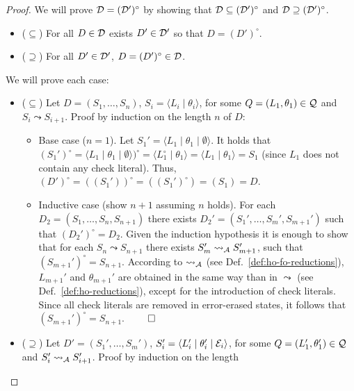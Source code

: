 \documentclass{llncs}
\newcommand{\A}
  {\ensuremath{{\cal A}}}
\newcommand{\gd}[0]{\mid}
\newcommand{\state}[2]
  {\ensuremath{\langle #1 \gd{} #2 \rangle}}
\newcommand{\exstate}[3]
  {\ensuremath{\langle #1 \gd{} #2 \gd{} #3 \rangle}}
\newcommand{\ADeps}{\ensuremath{{\cal E}}}
\newcommand{\reduction}[2]
  {\ensuremath{#1 \leadsto #2}}
\newcommand{\reductionA}[2]
  {\ensuremath{#1 \leadsto_{\A} #2}}
\newcommand{\errorErase}[1]
  {\ensuremath{#1^{\circ}}}
\begin{document}
\begin{proof}
We will prove ${\cal D} = \errorErase{({\cal D}')}$ by showing that 
  ${\cal D} \subseteq \errorErase{({\cal D}')}$
  and 
  ${\cal D} \supseteq \errorErase{({\cal D}')}$.
\begin{itemize}
  \item ($\subseteq$) For all $D \in {\cal D}$ exists
      $D' \in {\cal D}'$ so that $D = \errorErase{(D')}$.
  \item ($\supseteq$) For all $D' \in {\cal D}'$, 
      $D = \errorErase{(D')} \in {\cal D}$.
  \end{itemize}
  We will prove each case:
  \begin{itemize}
\item ($\subseteq$) Let $D = (S_1,\ldots,S_n)$, $S_i =
    \state{L_i}{\theta_i}$, for some $Q = (L_1,\theta_1) \in {\cal Q}$
    and $\reduction{S_i}{S_{i+1}}$. Proof by induction on the length
    $n$ of $D$:
    \begin{itemize}
    \item Base case ($n=1$). Let $S_1' =
      \exstate{L_1}{\theta_1}{\emptyset}$. It holds that
      $\errorErase{(S_1')} =
      \errorErase{\exstate{L_1}{\theta_1}{\emptyset})} =
      \state{\errorErase{L_1}}{\theta_1} = \state{L_1}{\theta_1} =
      S_1$ (since $L_1$ does not contain any check literal).
Thus, $\errorErase{(D')} = \errorErase{((S_1'))} =
      (\errorErase{(S_1')}) = (S_1) = D$.
    \item Inductive case (show $n+1$ assuming $n$ holds).
For each $D_2 = (S_1,\ldots,S_n,S_{n+1})$ there exists $D_2' =
      (S_1',\ldots,S_m',S_{m+1}')$ such that $\errorErase{(D_2')} =
      D_2$.
Given the induction hypothesis
it is enough to show that for each $\reduction{S_n}{S_{n+1}}$
      there exists $\reductionA{S_m'}{S_{m+1}'}$, such that
      $\errorErase{(S_{m+1}')} = S_{n+1}$.
According to $\reductionA{}{}$ (see
      Def.~\ref{def:ho-fo-reductions}), $L_{m+1}'$ and $\theta_{m+1}'$
      are obtained in the same way than in $\reduction{}{}$ (see
      Def.~\ref{def:ho-reductions}), except for the introduction of
      check literals. Since all check literals are removed in
      error-erased states, it follows that $\errorErase{(S_{m+1}')} =
      S_{n+1}$.
\hfill $\qed$
    \end{itemize}
\item ($\supseteq$) Let $D' = (S_1',\ldots,S_m')$, $S_i' =
    \exstate{L_i'}{\theta_i'}{\ADeps_i}$, for some $Q =
    (L_1',\theta_1') \in {\cal Q}$ and
    $\reductionA{S_i'}{S_{i+1}'}$. Proof by induction on the length

\end{itemize}
\end{proof}
\end{document}
